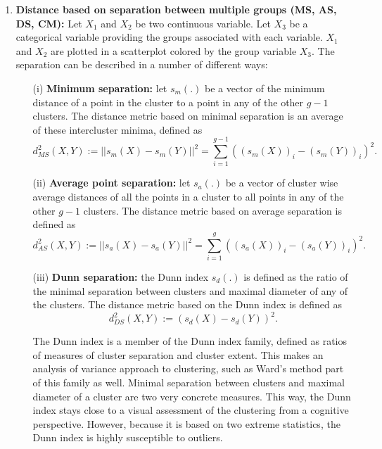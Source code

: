 \documentclass[12pt]{article}\usepackage[]{graphicx}\usepackage[]{color}
\newcommand{\hh}[1]{{\color{magenta} #1}}
\begin{document}
\begin{enumerate}
\item {\bf Distance based on separation between multiple groups (MS, AS, DS, CM):}
Let $X_1$ and $X_2$ be two continuous variable. Let $X_3$ be a categorical variable providing the groups associated with each variable. $X_1$ and $X_2$ are plotted in a scatterplot colored by the group variable $X_3$. The separation can be described in a number of different ways:
\begin{enumerate}
 \item[(i)] {\bf Minimum separation:} let  $s_{m}(.)$ be a vector of the minimum distance of a point in the cluster to a point in any of the other $g-1$ clusters. 
 The distance metric based on minimal separation is an average of these intercluster minima, defined as
 \[
 d^2_{MS}(X, Y):= ||s_m(X) - s_m(Y)||^2 = \sum_{i = 1}^{g-1} ((s_m(X))_i - (s_m(Y))_i)^2.
 \]



\item[(ii)] {\bf Average point separation:} let $s_{a}(.)$ be a vector of cluster wise average distances of all the points in a cluster to all points in any of the other $g-1$ clusters. The distance metric based on average separation is defined as
\[
d^2_{AS}(X, Y):= ||s_a(X) - s_a(Y)||^2 = \sum_{i = 1}^g ((s_a(X))_i - (s_a(Y))_i)^2.
\]

\item[(iii)] {\bf Dunn separation:} the Dunn index \citep{dunn:1973, halkidi:2001} $s_d(.)$ is defined as the ratio of the minimal separation between clusters and maximal diameter of any of the clusters. 
The distance metric based on the Dunn index is defined as 
\[
d^2_{DS} (X, Y):= \left(s_d(X) - s_d(Y)\right)^2.
\]

The Dunn index is a member of the Dunn index family, defined as ratios of measures of cluster separation and cluster extent. This makes an analysis of variance approach to clustering, such as Ward's method part of this family as well. Minimal separation between clusters and maximal diameter of a cluster are two very concrete measures. This way, the Dunn index stays close to a visual assessment of the clustering from a cognitive perspective. However, because it is based on two extreme statistics, the  Dunn index is highly susceptible to outliers. 
\end{enumerate}


\end{enumerate}
\end{document}
